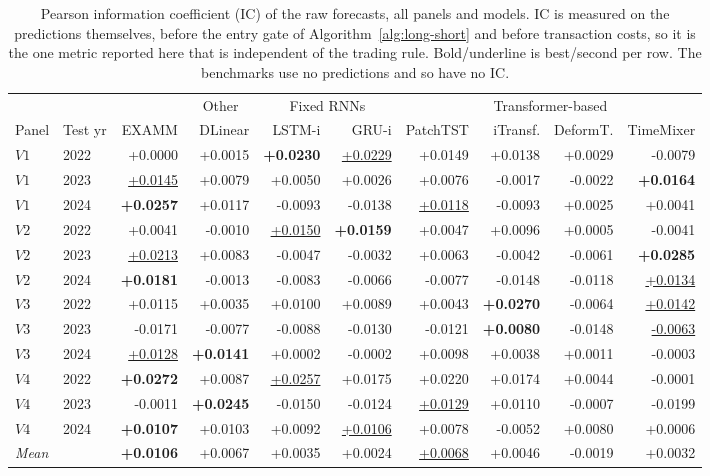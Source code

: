 \begin{table}[t]
\centering
\caption{Pearson information coefficient (IC) of the raw forecasts, all panels and models. IC is measured on the predictions themselves, before the entry gate of Algorithm~\ref{alg:long-short} and before transaction costs, so it is the one metric reported here that is independent of the trading rule. Bold/underline is best/second per row. The benchmarks use no predictions and so have no IC.}
\label{tab:ic}
\footnotesize
\begin{tabular}{llrrrrrrrr}
\toprule
 & &  & \multicolumn{1}{c}{Other} & \multicolumn{2}{c}{Fixed RNNs} & \multicolumn{4}{c}{Transformer-based} \\
\cmidrule(lr){4-4} \cmidrule(lr){5-6} \cmidrule(lr){7-10}
Panel & Test yr & EXAMM & DLinear & LSTM-i & GRU-i & PatchTST & iTransf. & DeformT. & TimeMixer \\
\midrule
$V1$ & 2022 & +0.0000 & +0.0015 & \textbf{+0.0230} & \underline{+0.0229} & +0.0149 & +0.0138 & +0.0029 & -0.0079 \\
$V1$ & 2023 & \underline{+0.0145} & +0.0079 & +0.0050 & +0.0026 & +0.0076 & -0.0017 & -0.0022 & \textbf{+0.0164} \\
$V1$ & 2024 & \textbf{+0.0257} & +0.0117 & -0.0093 & -0.0138 & \underline{+0.0118} & -0.0093 & +0.0025 & +0.0041 \\
\addlinespace
$V2$ & 2022 & +0.0041 & -0.0010 & \underline{+0.0150} & \textbf{+0.0159} & +0.0047 & +0.0096 & +0.0005 & -0.0041 \\
$V2$ & 2023 & \underline{+0.0213} & +0.0083 & -0.0047 & -0.0032 & +0.0063 & -0.0042 & -0.0061 & \textbf{+0.0285} \\
$V2$ & 2024 & \textbf{+0.0181} & -0.0013 & -0.0083 & -0.0066 & -0.0077 & -0.0148 & -0.0118 & \underline{+0.0134} \\
\addlinespace
$V3$ & 2022 & +0.0115 & +0.0035 & +0.0100 & +0.0089 & +0.0043 & \textbf{+0.0270} & -0.0064 & \underline{+0.0142} \\
$V3$ & 2023 & -0.0171 & -0.0077 & -0.0088 & -0.0130 & -0.0121 & \textbf{+0.0080} & -0.0148 & \underline{-0.0063} \\
$V3$ & 2024 & \underline{+0.0128} & \textbf{+0.0141} & +0.0002 & -0.0002 & +0.0098 & +0.0038 & +0.0011 & -0.0003 \\
\addlinespace
$V4$ & 2022 & \textbf{+0.0272} & +0.0087 & \underline{+0.0257} & +0.0175 & +0.0220 & +0.0174 & +0.0044 & -0.0001 \\
$V4$ & 2023 & -0.0011 & \textbf{+0.0245} & -0.0150 & -0.0124 & \underline{+0.0129} & +0.0110 & -0.0007 & -0.0199 \\
$V4$ & 2024 & \textbf{+0.0107} & +0.0103 & +0.0092 & \underline{+0.0106} & +0.0078 & -0.0052 & +0.0080 & +0.0006 \\
\midrule
\multicolumn{2}{l}{\textit{Mean}} & \textbf{+0.0106} & +0.0067 & +0.0035 & +0.0024 & \underline{+0.0068} & +0.0046 & -0.0019 & +0.0032 \\
\bottomrule
\end{tabular}
\end{table}
